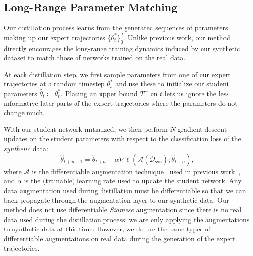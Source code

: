 
\subsection{Long-Range Parameter Matching}
Our distillation process learns from the generated sequences of parameters making up our expert trajectories $\{\theta^*_t\}_0^T$. Unlike previous work, our method directly encourages the long-range training dynamics induced by our synthetic dataset to match those of networks trained on the real data.

At each distillation step, we first sample parameters from one of our expert trajectories at a random timestep $\theta^*_t$ and use these to initialize our student parameters $\hat{\theta}_t \coloneqq \theta^*_t$. Placing an upper bound $T^+$ on $t$ lets us ignore the less informative later parts of the expert trajectories where the parameters do not change much.

With our student network initialized, we then perform $N$ gradient descent updates on the student parameters with respect to the classification loss of the \emph{synthetic} data:
\begin{equation}
    \hat{\theta}_{t+n+1} = \hat{\theta}_{t+n} - \alpha \nabla \ell(\mathcal{A}(\mathcal{D}_\mathsf{syn}); \hat{\theta}_{t+n}),
\end{equation}
where $\mathcal{A}$ is the differentiable augmentation technique~\cite{stylegan2ada,zhao2020image,tran2020towards,diffaug} used in previous work~\cite{dsa}, and $\alpha$ is the (trainable) learning rate used to update the student network. Any data augmentation used during distillation must be differentiable so that we can back-propagate through the augmentation layer to our synthetic data. Our method does not use differentiable \textit{Siamese} augmentation since there is no real data used during the distillation process; we are only applying the augmentations to synthetic data at this time. However, we do use the same types of differentiable augmentations on real data during the generation of the expert trajectories.

